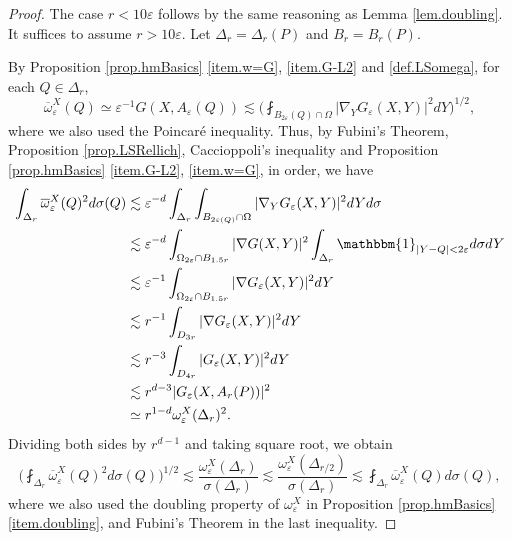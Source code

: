 \documentclass[reqno,12pt]{amsart} %
\theoremstyle{definition}
\theoremstyle{remark}
\numberwithin{equation}{section}
\newcommand{\e}{\varepsilon}
\begin{document}
\begin{proof}
    The case $r<10\e$ follows by the same reasoning as Lemma \ref{lem.doubling}. It suffices to assume $r>10\e$. Let $\Delta_r = \Delta_r(P)$ and $B_r = B_r(P)$.

    By Proposition \ref{prop.hmBasics} \ref{item.w=G}, \ref{item.G-L2}  and \eqref{def.LSomega}, for each $Q\in \Delta_r$,
    \begin{equation}
        \overline{\omega}_\e^X(Q) \simeq \e^{-1} G(X, A_\e(Q)) \lesssim \bigg( \fint_{B_{2\e}(Q) \cap \Omega} |\nabla_Y G_\e(X, Y)|^2 dY \bigg)^{1/2},
    \end{equation}
    where we also used the Poincar\'{e} inequality. Thus, by Fubini's Theorem, Proposition \ref{prop.LSRellich}, Caccioppoli's inequality and Proposition \ref{prop.hmBasics} \ref{item.G-L2}, \ref{item.w=G}, in order, we have
    \begin{equation}
    \begin{aligned}
        \int_{\Delta_r} \overline{\omega}_\e^X(Q)^2 d\sigma(Q) & \lesssim \e^{-d} \int_{\Delta_r} \int_{B_{2\e(Q)} \cap \Omega} |\nabla_Y G_\e(X,Y)|^2 dY d\sigma \\
        & \lesssim \e^{-d} \int_{\Omega_{2\e} \cap B_{1.5r}} |\nabla G(X,Y)|^2 \int_{\Delta_r} \mathbbm{1}_{|Y-Q| < 2\e} d\sigma dY\\
        & \lesssim \e^{-1} \int_{\Omega_{2\e} \cap B_{1.5r}} |\nabla G_\e(X,Y)|^2 dY \\
        & \lesssim r^{-1} \int_{D_{3r}} |\nabla G_\e(X,Y)|^2 dY \\
        & \lesssim r^{-3} \int_{D_{4r}} |G_\e(X, Y)|^2 dY \\
        & \lesssim r^{d-3} |G_\e(X, A_r(P))|^2 \\
        & \simeq r^{1-d} \omega_\e^X(\Delta_r)^2.
    \end{aligned}
    \end{equation}
    Dividing both sides by $r^{d-1}$ and taking square root, we obtain
    \begin{equation}
        \bigg( \fint_{\Delta_r} \overline{\omega}_\e^X(Q)^2 d\sigma(Q) \bigg)^{1/2} \lesssim \frac{\omega_\e^X(\Delta_r)}{\sigma(\Delta_r)} \lesssim  \frac{\omega_\e^X(\Delta_{r/2})}{\sigma(\Delta_r)} \lesssim \fint_{\Delta_{r}} \overline{\omega}_\e^X(Q) d\sigma(Q),
    \end{equation}
    where we also used the doubling property of $\omega^X_\e$ in Proposition \ref{prop.hmBasics} \ref{item.doubling}, and Fubini's Theorem in the last inequality.
\end{proof}
\end{document}
